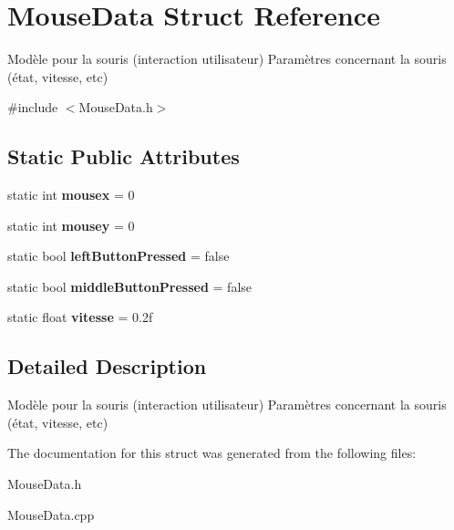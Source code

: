 \hypertarget{structMouseData}{}\section{Mouse\+Data Struct Reference}
\label{structMouseData}


Modèle pour la souris (interaction utilisateur) Paramètres concernant la souris (état, vitesse, etc)  




{\ttfamily \#include $<$Mouse\+Data.\+h$>$}

\subsection*{Static Public Attributes}
\begin{DoxyCompactItemize}
\item 
\mbox{\label{structMouseData_a97eb3138f2f52f859b0d16e683d8cfcb}} 
static int {\bfseries mousex} = 0
\item 
\mbox{\label{structMouseData_aea43f059e0ff26829a0a8d8619b3f18c}} 
static int {\bfseries mousey} = 0
\item 
\mbox{\label{structMouseData_a0aba8d6075bdc8237efa484ffaeae14a}} 
static bool {\bfseries left\+Button\+Pressed} = false
\item 
\mbox{\label{structMouseData_a00962824d35b75221cc3198467cc8907}} 
static bool {\bfseries middle\+Button\+Pressed} = false
\item 
\mbox{\label{structMouseData_a86d3b28c7d10597467bb0288e6863941}} 
static float {\bfseries vitesse} = 0.\+2f
\end{DoxyCompactItemize}


\subsection{Detailed Description}
Modèle pour la souris (interaction utilisateur) Paramètres concernant la souris (état, vitesse, etc) 

The documentation for this struct was generated from the following files\+:\begin{DoxyCompactItemize}
\item 
Mouse\+Data.\+h\item 
Mouse\+Data.\+cpp\end{DoxyCompactItemize}
